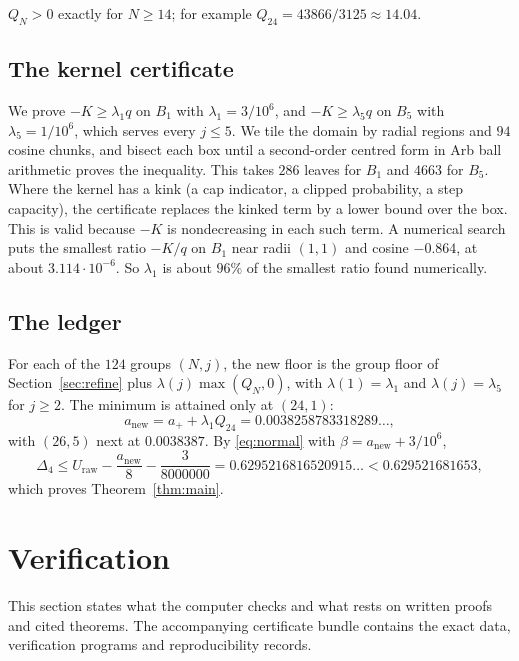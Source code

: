 \documentclass[11pt]{amsart}
\numberwithin{equation}{section}
\theoremstyle{remark}
\begin{document}
$Q_N>0$ exactly for $N\ge14$; for example $Q_{24}=43866/3125\approx14.04$.

\subsection*{The kernel certificate}
We prove $-K\ge\lambda_1q$ on $B_1$ with $\lambda_1=3/10^6$, and $-K\ge\lambda_5q$ on $B_5$ with $\lambda_5=1/10^6$, which serves every $j\le5$. We tile the domain by radial regions and $94$ cosine chunks, and bisect each box until a second-order centred form in Arb ball arithmetic proves the inequality. This takes $286$ leaves for $B_1$ and $4663$ for $B_5$. Where the kernel has a kink (a cap indicator, a clipped probability, a step capacity), the certificate replaces the kinked term by a lower bound over the box. This is valid because $-K$ is nondecreasing in each such term. A numerical search puts the smallest ratio $-K/q$ on $B_1$ near radii $(1,1)$ and cosine $-0.864$, at about $3.114\cdot10^{-6}$. So $\lambda_1$ is about $96\%$ of the smallest ratio found numerically.

\subsection*{The ledger}
For each of the $124$ groups $(N,j)$, the new floor is the group floor of Section~\ref{sec:refine} plus $\lambda(j)\max(Q_N,0)$, with $\lambda(1)=\lambda_1$ and $\lambda(j)=\lambda_5$ for $j\ge2$. The minimum is attained only at $(24,1)$:
\[
a_{\mathrm{new}}=a_++\lambda_1Q_{24}=0.0038258783318289\ldots,
\]
with $(26,5)$ next at $0.0038387$. By \eqref{eq:normal} with $\beta=a_{\mathrm{new}}+3/10^6$,
\[
\Delta_4\le U_{\mathrm{raw}}-\frac{a_{\mathrm{new}}}8-\frac3{8000000}=0.6295216816520915\ldots<0.629521681653,
\]
which proves Theorem~\ref{thm:main}.

\section{Verification}\label{sec:verif}

This section states what the computer checks and what rests on written proofs and cited theorems. The accompanying certificate bundle contains the exact data, verification programs and reproducibility records.
\end{document}

